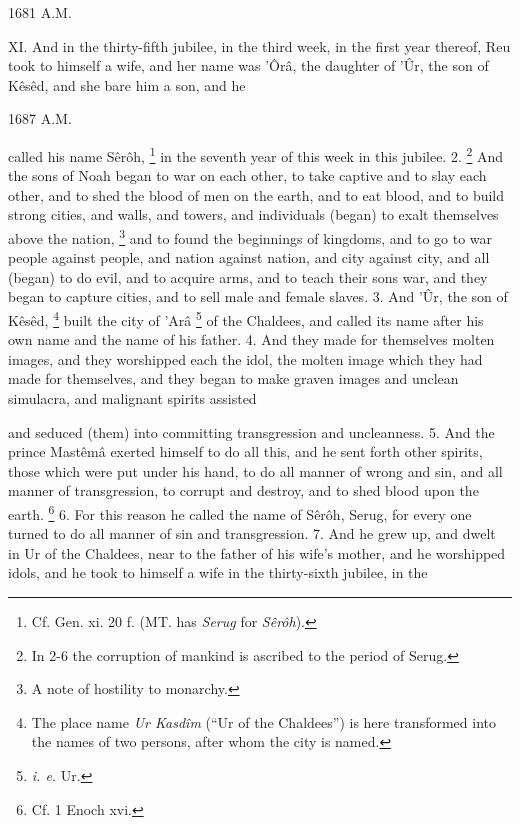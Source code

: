 
1681 A.M.

XI. And in the thirty-fifth jubilee, in the third week, in the first year thereof, Reu took to himself a wife, and her name was ’Ôrâ, the daughter of ’Ûr, the son of Kêsêd, and she bare him a son, and he

1687 A.M.

called his name Sêrôh, \footnote{Cf. Gen. xi. 20 f. (MT. has \emph{Serug} for \emph{Sêrôh}).} in the seventh year of this week in this jubilee. 2. \footnote{In 2-6 the corruption of mankind is ascribed to the period of Serug.} And the sons of Noah began to war on each other, to take captive and to slay each other, and to shed the blood of men on the earth, and to eat blood, and to build strong cities, and walls, and towers, and individuals (began) to exalt themselves above the nation, \footnote{A note of hostility to monarchy.} and to found the beginnings of kingdoms, and to go to war people against people, and nation against nation, and city against city, and all (began) to do evil, and to acquire arms, and to teach their sons war, and they began to capture cities, and to sell male and female slaves. 3. And ’Ûr, the son of Kêsêd, \footnote{The place name \emph{Ur Kasdîm} (``Ur of the Chaldees'') is here transformed into the names of two persons, after whom the city is named.} built the city of ’Arâ \footnote{\emph{i. e.} Ur.} of the Chaldees, and called its name after his own name and the name of his father. 4. And they made for themselves molten images, and they worshipped each the idol, the molten image which they had made for themselves, and they began to make graven images and unclean simulacra, and malignant spirits assisted

and seduced (them) into committing transgression and uncleanness. 5. And the prince Mastêmâ exerted himself to do all this, and he sent forth other spirits, those which were put under his hand, to do all manner of wrong and sin, and all manner of transgression, to corrupt and destroy, and to shed blood upon the earth. \footnote{Cf. 1 Enoch xvi.} 6. For this reason he called the name of Sêrôh, Serug, for every one turned to do all manner of sin and transgression. 7. And he grew up, and dwelt in Ur of the Chaldees, near to the father of his wife's mother, and he worshipped idols, and he took to himself a wife in the thirty-sixth jubilee, in the

